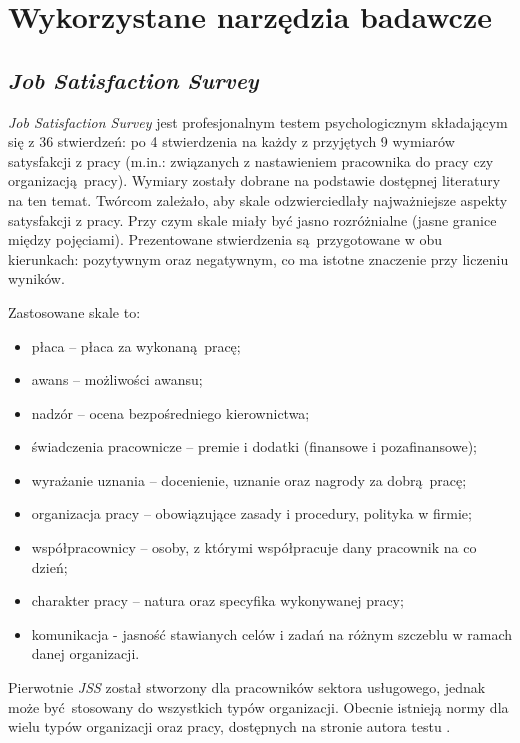 \chapter{Wykorzystane narzędzia badawcze}
\section{\emph{Job Satisfaction Survey}}
\emph{Job Satisfaction Survey} jest profesjonalnym testem psychologicznym składającym się z 36 stwierdzeń: po 4 stwierdzenia na każdy z przyjętych 9 wymiarów satysfakcji z pracy (m.in.: związanych z nastawieniem pracownika do pracy czy organizacją pracy). Wymiary zostały dobrane na podstawie dostępnej literatury na ten temat. Twórcom zależało, aby skale odzwierciedlały najważniejsze aspekty satysfakcji z pracy. Przy czym skale miały być jasno
rozróżnialne (jasne granice między pojęciami). Prezentowane stwierdzenia są przygotowane w obu kierunkach: pozytywnym oraz negatywnym, co ma istotne znaczenie przy liczeniu wyników. 

Zastosowane skale to:
\begin{itemize}
\item płaca -- płaca za wykonaną pracę;
\item awans -- możliwości awansu;
\item nadzór -- ocena bezpośredniego kierownictwa;
\item świadczenia pracownicze -- premie i dodatki (finansowe i pozafinansowe);
\item wyrażanie uznania -- docenienie, uznanie oraz nagrody za dobrą pracę;
\item organizacja pracy -- obowiązujące zasady i procedury, polityka w firmie;
\item współpracownicy -- osoby, z którymi współpracuje dany pracownik na co dzień;
\item charakter pracy -- natura oraz specyfika wykonywanej pracy;
\item komunikacja - jasność stawianych celów i zadań na różnym szczeblu w ramach danej organizacji.
\end{itemize}

Pierwotnie \emph{JSS} został stworzony dla pracowników sektora usługowego, jednak może być stosowany do wszystkich typów organizacji. Obecnie istnieją normy dla wielu typów organizacji oraz pracy, dostępnych na stronie autora testu \cite{web:jss-norms}.  

